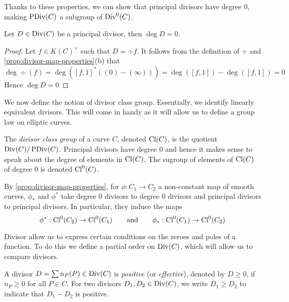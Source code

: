 Thanks to these properties, we can show that principal divisors have degree
0, making $\operatorname{PDiv}(C)$ a subgroup of $\operatorname{Div}^0(C)$.

\begin{proposition}
	Let $D \in \operatorname{Div}(C)$ be a principal divisor, then $\deg D = 0$.
\end{proposition}

\begin{proof}
	Let $f \in K(C)^\times$ such that $D = \div f$. It follows from the
	definition of $\div$ and \ref{prop:divisor-map-properties}(b) that
	\begin{equation*}
		\deg \div(f) = \deg([f, 1]^*((0) - (\infty)))
		= \deg([f, 1]) - \deg([f, 1]) = 0
	\end{equation*}
	Hence $\deg D = 0$
\end{proof}

We now define the notion of divisor class group. Essentially, we identify
linearly equivalent divisors. This will come in handy as it will allow us
to define a group law on elliptic curves.

\begin{definition}
	The \emph{divisor class group} of a curve $C$,
	denoted $\operatorname{Cl}(C)$, is the quotient $\operatorname{Div}(C)/\operatorname{PDiv}(C)$.
	Principal divisors have degree $0$ and hence it makes sense to speak about
	the degree of elements in $\operatorname{Cl}(C)$. The sugroup of elements of $\operatorname{Cl}(C)$ of
	degree $0$ is denoted $\operatorname{Cl}^0(C)$.
\end{definition}

\begin{remark}
	By \ref{prop:divisor-map-properties}, for $\phi: C_1\to C_2$ a non-constant
	map of smooth curves, $\phi_*$ and $\phi^*$ take degree 0 divisors to degree
	0 divisors and principal divisors to principal divisors.
	In particular, they induce the maps
	\begin{equation*}
		\phi^*: \operatorname{Cl}^0(C_2) \to \operatorname{Cl}^0(C_1)
		\qquad\textrm{and}\qquad
		\phi_*: \operatorname{Cl}^0(C_1) \to \operatorname{Cl}^0(C_2)
	\end{equation*}
\end{remark}

Divisor allow us to express certain conditions on the zeroes and poles
of a function. To do this we define a partial order on $\operatorname{Div}(C)$, which will
allow us to compare divisors.

\begin{definition}
	A divisor $D = \sum n_P(P) \in \operatorname{Div}(C)$ is \emph{positive} (or
	\emph{effective}), denoted by
	$D \geq 0$, if $n_P \geq 0$ for all $P \in C$.
	For two divisors $D_1, D_2 \in \operatorname{Div}(C)$, we write $D_1 \geq D_2$
	to indicate that $D_1 - D_2$ is positive.
\end{definition}

